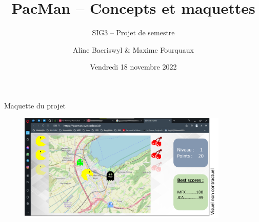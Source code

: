 \documentclass{beamer}
\title{PacMan -- Concepts et maquettes}
\subtitle{SIG3 -- Projet de semestre}
\author{Aline Baeriswyl \& Maxime Fourquaux}
\date{Vendredi 18 novembre 2022}
\institute[HEIG]%
{
    HEIG-VD  -- EC+G \\
    Orientation GGT
}
\begin{document}
\frame{\titlepage}


\begin{frame}{Maquette du projet}
    \begin{figure}
        \centering
        \includegraphics[width=10cm]{maquette.png}
    \end{figure}
\end{frame}
\end{document}
